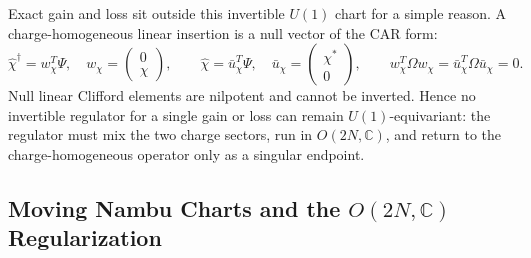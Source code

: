 \documentclass[aps,prb,onecolumn,nofootinbib,superscriptaddress]{revtex4-2}
\theoremstyle{plain}
\theoremstyle{definition}
\begin{document}
Exact gain and loss sit outside this invertible \(U(1)\) chart for a simple
reason.  A charge-homogeneous linear insertion is a null vector of the CAR
form:
\begin{equation}
  \hat\chi^\dagger=w_\chi^T\Psi,
  \quad
  w_\chi=\begin{pmatrix}0\\ \chi\end{pmatrix},
  \qquad
  \hat\chi=\bar u_\chi^T\Psi,
  \quad
  \bar u_\chi=\begin{pmatrix}\chi^*\\0\end{pmatrix},
  \qquad
  w_\chi^T\Omega w_\chi=\bar u_\chi^T\Omega\bar u_\chi=0 .
  \label{eq:gain-loss-null-covectors}
\end{equation}
Null linear Clifford elements are nilpotent and cannot be inverted.  Hence no
invertible regulator for a single gain or loss can remain \(U(1)\)-equivariant:
the regulator must mix the two charge sectors, run in \(O(2N,\mathbb C)\), and
return to the charge-homogeneous operator only as a singular endpoint.


\subsection{\texorpdfstring{Moving Nambu Charts and the \(O(2N,\mathbb C)\)
Regularization}{Moving Nambu Charts and the O(2N,C) Regularization}}
\label{sec:onambu-regularization}
\end{document}
